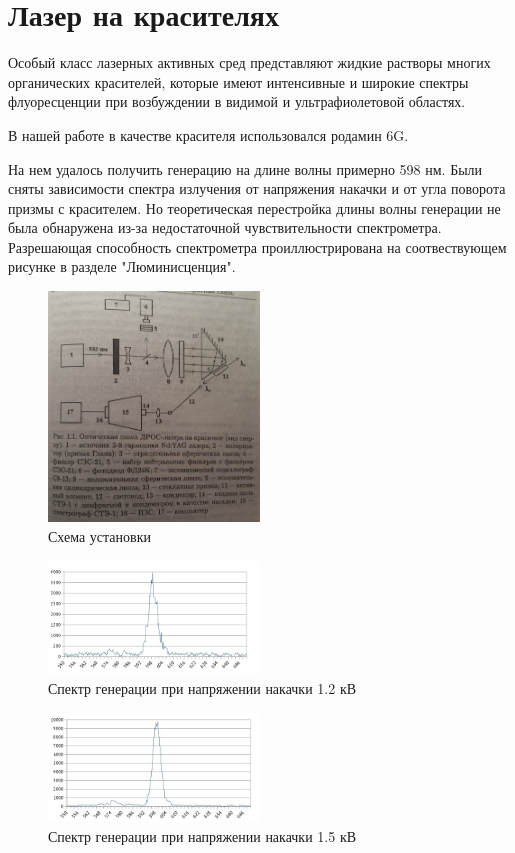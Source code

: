 \documentclass[twocolumn]{article}
\begin{document}
\section{Лазер на красителях}Особый класс лазерных активных сред представляют жидкие растворы многих органических красителей, которые имеют интенсивные
и широкие спектры флуоресценции при возбуждении в видимой и ультрафиолетовой областях. 

В нашей работе в качестве красителя использовался родамин 6G.

На нем удалось получить генерацию на длине волны примерно 598 нм. Были сняты зависимости спектра излучения от напряжения накачки и от угла поворота призмы с красителем. Но теоретическая перестройка длины волны генерации не была обнаружена из-за недостаточной чувствительности спектрометра. Разрешающая способность спектрометра проиллюстрирована на соотвествующем рисунке в разделе "Люминисценция".
\begin{figure}[h]
\centering
\includegraphics[width=0.5\textwidth]{LEMPH Report_files/scheme.jpg}
\caption{Схема установки \label{fig:kakaha}}
\end{figure}
\begin{figure}[h]
\centering
\includegraphics[width=0.5\textwidth]{LEMPH Report_files/1,2.jpg}
\caption{Спектр генерации при напряжении накачки 1.2 кВ}
\end{figure}
\begin{figure}[h]
\centering
\includegraphics[width=0.5\textwidth]{LEMPH Report_files/1,5.jpg}
\caption{Спектр генерации при напряжении накачки 1.5 кВ}
\end{figure}
\end{document}
